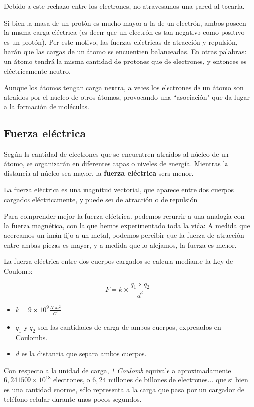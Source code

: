 Debido a este rechazo entre los electrones, no atravesamos una pared al tocarla.

Si bien la masa de un protón es mucho mayor a la de un electrón, ambos poseen la misma carga eléctrica (es decir que un electrón es tan negativo como positivo es un protón). Por este motivo, las fuerzas eléctricas de atracción y repulsión, harán que las cargas de un átomo se encuentren balanceadas. En otras palabras: un átomo tendrá la misma cantidad de protones que de electrones, y entonces es eléctricamente neutro.

Aunque los átomos tengan carga neutra, a veces los electrones de un átomo son atraídos por el núcleo de otros átomos, provocando una ``asociación" que da lugar a la formación de moléculas.

\subsection{Fuerza eléctrica}

Según la cantidad de electrones que se encuentren atraídos al núcleo de un átomo, se organizarán en diferentes capas o niveles de energía. Mientras la distancia al núcleo sea mayor, la \textbf{fuerza eléctrica} será menor.

La fuerza eléctrica es una magnitud vectorial, que aparece entre dos cuerpos cargados eléctricamente, y puede ser de atracción o de repulsión.

Para comprender mejor la fuerza eléctrica, podemos recurrir a una analogía con la fuerza magnética, con la que hemos experimentado toda la vida: 
A medida que acercamos un imán fijo a un metal, podemos percibir que la fuerza de atracción entre ambas piezas es mayor, y a medida que lo alejamos, la fuerza es menor.

La fuerza eléctrica entre dos cuerpos cargados se calcula mediante la Ley de Coulomb:

$$ F = k \times \frac{q_1 \times q_2}{d^{2}} $$

\begin{itemize}
	\item $k=9 \times 10^{9}\frac{N.m^{2}}{C^{2}}$
	\item $q_1$ y $q_2$ son las cantidades de carga de ambos cuerpos, expresados en Coulombs.
	\item $d$ es la distancia que separa ambos cuerpos.
\end{itemize}

Con respecto a la unidad de carga, \textit{1 Coulomb} equivale a aproximadamente $6,241509\times 10^{18}$ electrones, o $6,24$ millones de billones de electrones... que si bien es una cantidad enorme, sólo representa a la carga que pasa por un cargador de teléfono celular durante unos pocos segundos.

